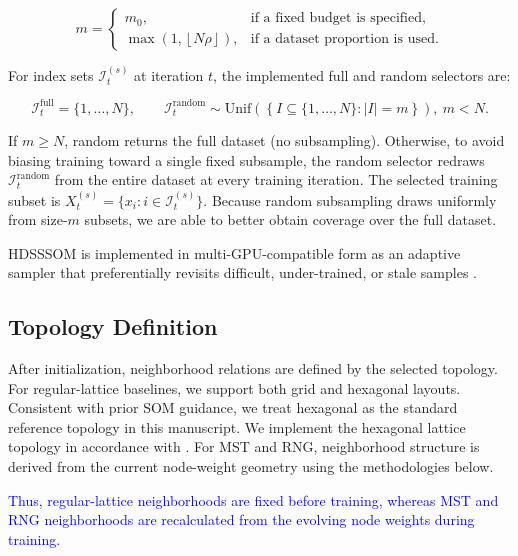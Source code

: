 \documentclass[10pt]{article} %
\newcommand{\TrackedChange}[1]{\textcolor{blue}{#1}}
\begin{document}
\begin{equation*}
m=
\begin{cases}
m_0, & \text{if a fixed budget is specified},\\[4pt]
\max\!\left(1,\left\lfloor N\rho \right\rfloor\right), & \text{if a dataset proportion is used}.
\end{cases}
\tag{1}
\end{equation*}

For index sets $\mathcal{I}_t^{(s)}$ at iteration $t$, the implemented full and random selectors are:

\begin{equation*}
\mathcal{I}_t^{\mathrm{full}}=\{1,\dots,N\},
\qquad
\mathcal{I}_t^{\mathrm{random}} \sim \mathrm{Unif}\!\left(\left\{I\subseteq\{1,\dots,N\}:|I|=m\right\}\right),\ m<N.
\tag{2}
\end{equation*}

If $m\ge N$, random returns the full dataset (no subsampling). Otherwise, to avoid biasing training toward a single fixed subsample, the random selector redraws $\mathcal{I}_t^{\mathrm{random}}$ from the entire dataset at every training iteration. The selected training subset is $X_t^{(s)}=\{x_i:i\in\mathcal{I}_t^{(s)}\}$. Because random subsampling draws uniformly from size-$m$ subsets, we are able to better obtain coverage over the full dataset.

HDSSSOM is implemented in multi-GPU-compatible form as an adaptive sampler that preferentially revisits difficult, under-trained, or stale samples \citep{wetmoreSpeedingSelfOrganizingFeature2005}.

\subsection{Topology Definition}

After initialization, neighborhood relations are defined by the selected topology. For regular-lattice baselines, we support both grid and hexagonal layouts. Consistent with prior SOM guidance, we treat hexagonal as the standard reference topology in this manuscript. We implement the hexagonal lattice topology in accordance with \citep{vettigliJustGlowingMinisom2018}. For MST and RNG, neighborhood structure is derived from the current node-weight geometry using the methodologies below.

\TrackedChange{Thus, regular-lattice neighborhoods are fixed before training, whereas MST and RNG neighborhoods are recalculated from the evolving node weights during training.}
\end{document}
